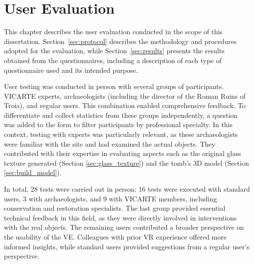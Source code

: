 
%

\chapter{User Evaluation}
\label{cha:user_evaluation}
\setlength{\parskip}{0pt} 

This chapter describes the user evaluation conducted in the scope of this dissertation. 
Section~\ref{sec:protocol} describes the methodology and procedures adopted for the evaluation, while Section~\ref{sec:results} presents the results obtained from the questionnaires, including a description of each type of questionnaire used and its intended purpose.

User testing was conducted in person with several groups of participants. \gls{VICARTE} experts, archaeologists (including the director of the Roman Ruins of Troia), and regular users. This combination enabled comprehensive feedback.
To differentiate and collect statistics from these groups independently, a question was added to the form to filter participants by professional specialty.
In this context, testing with experts was particularly relevant, as these archaeologists were familiar with the site and had examined the actual objects. They contributed with their expertise in evaluating aspects such as the original glass texture generated (Section \ref{sec:glass_texture}) and the tomb’s \gls{3D} model (Section \ref{sec:build_model}).

In total, 28 tests were carried out in person: 16 tests were executed with standard users, 3 with archaeologists, and 9 with \gls{VICARTE} members, including conservation and restoration specialists. The last group provided essential technical feedback in this field, as they were directly involved in interventions with the real objects.
The remaining users contributed a broader perspective on the usability of the \gls{VE}. Colleagues with prior \gls{VR} experience offered more informed insights, while standard users provided suggestions from a regular user’s perspective.


